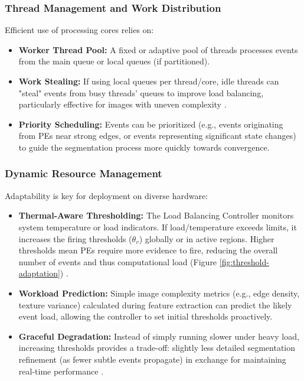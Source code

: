 \documentclass[conference]{IEEEtran}
\begin{document}
\subsubsection{Thread Management and Work Distribution} \label{subsubsec:thread_management}
Efficient use of processing cores relies on:
\begin{itemize}
    \item \textbf{Worker Thread Pool:} A fixed or adaptive pool of threads processes events from the main queue or local queues (if partitioned).
    \item \textbf{Work Stealing:} If using local queues per thread/core, idle threads can "steal" events from busy threads' queues to improve load balancing, particularly effective for images with uneven complexity \cite{Chase2005}.
    \item \textbf{Priority Scheduling:} Events can be prioritized (e.g., events originating from PEs near strong edges, or events representing significant state changes) to guide the segmentation process more quickly towards convergence.
\end{itemize}

\subsubsection{Dynamic Resource Management} \label{subsubsec:dynamic_resource}
Adaptability is key for deployment on diverse hardware:
\begin{itemize}
    \item \textbf{Thermal-Aware Thresholding:} The Load Balancing Controller monitors system temperature or load indicators. If load/temperature exceeds limits, it increases the firing thresholds (\(\theta_v\)) globally or in active regions. Higher thresholds mean PEs require more evidence to fire, reducing the overall number of events and thus computational load (Figure \ref{fig:threshold-adaptation}) \cite{Muir2025}.
    \item \textbf{Workload Prediction:} Simple image complexity metrics (e.g., edge density, texture variance) calculated during feature extraction can predict the likely event load, allowing the controller to set initial thresholds proactively.
    \item \textbf{Graceful Degradation:} Instead of simply running slower under heavy load, increasing thresholds provides a trade-off: slightly less detailed segmentation refinement (as fewer subtle events propagate) in exchange for maintaining real-time performance \cite{Christensen2022}.
\end{itemize}
\end{document}

